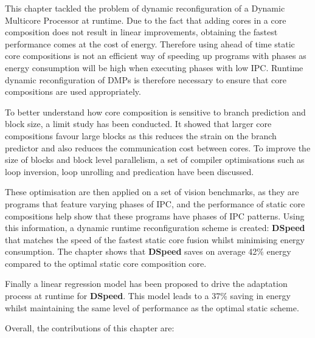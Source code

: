 This chapter tackled the problem of dynamic reconfiguration of a Dynamic Multicore Processor at runtime.
Due to the fact that adding cores in a core composition does not result in linear improvements, obtaining the fastest performance comes at the cost of energy.
Therefore using ahead of time static core compositions is not an efficient way of speeding up programs with phases as energy consumption will be high when executing phases with low IPC. %
Runtime dynamic reconfiguration of DMPs is therefore necessary to ensure that core compositions are used appropriately.

To better understand how core composition is sensitive to branch prediction and block size, a limit study has been conducted.
It showed that larger core compositions favour large blocks as this reduces the strain on the branch predictor and also reduces the communication cost between cores.
To improve the size of blocks and block level parallelism, a set of compiler optimisations such as loop inversion, loop unrolling and predication have been discussed.

These optimisation are then applied on a set of vision benchmarks, as they are programs that feature varying phases of IPC, and the performance of static core compositions help show that these programs have phases of IPC patterns.
Using this information, a dynamic runtime reconfiguration scheme is created:  \textbf{DSpeed} that matches the speed of the fastest static core fusion whilst minimising energy consumption.%
The chapter shows that \textbf{DSpeed} saves on average 42\% energy compared to the optimal static core composition core.%

Finally a linear regression model has been proposed to drive the adaptation process at runtime for \textbf{DSpeed}.
This model leads to a 37\% saving in energy whilst maintaining the same level of performance as the optimal static scheme.

Overall, the contributions of this chapter are:

